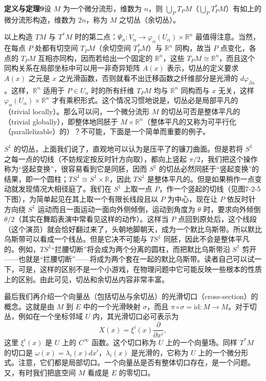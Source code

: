 \noindent\textbf{定义与定理9}\quad 设 $M$ 为一个微分流形，维数为 $n$，则 $\bigcup_PT_PM$（$\bigcup_PT_P^*M$）有如上的微分流形构造，维数为 $2n$，称为 $M$ 之切丛（余切丛）。

以上构造 $TM$ 与 $T^*M$ 时的第二点：$\Psi_\alpha:V_\alpha\to\varphi_\alpha(U_\alpha)\times\mathbb R^n$ 最值得注意。当然，在每点 $P$ 处都有切空间 $T_PM$（余切空间 $T_P^*M$）与 $\mathbb R^n$ 同构，故当 $P$ 点变化，各点的 $T_PM$ 互相亦同构，因而若给出一个固定的 $\mathbb R^n$，这些 $T_PM\cong\mathbb R^n$，而且这个同构关系在局部坐标中可以用一非奇异矩阵 $A(x)$ 表示，切丛的定义要求 $A(x)$ 之元是 $x$ 之光滑函数，否则就看不出迁移函数之纤维部分是光滑的 $d\varphi_{\beta\alpha}$。这样，$\mathbb R^n$ 适用于 $P\in U_\alpha$ 时的所有纤维 $T_PM$ 均与 $\mathbb R^n$ 同构而与 $x$ 无关，这样 $\varphi_\alpha(U_\alpha)\times\mathbb R^n$ 才有乘积形式。这个情况习惯地说是，切丛必是局部平凡的（trivial locally）。那么可以问，一个微分流形 $M$ 的切丛可否是整体平凡的（trivial globally），即整体地同胚于 $M\times\mathbb R^n$（整体平凡的又称为可平行化（parallelizable）的）？不可能，下面是一个简单而重要的例子。

$S^1$ 的切丛，上面我们说了，直观地可以认为是压平了的镰刀曲面。但是若将 $S^1$ 之每一点的切线（不妨规定按反时针方向取），都向上竖起 $\pi/2$，我们把这个操作称为“竖起变换”，很容易看到它是同胚，因而 $S^1$ 的切丛必然同胚于“竖起变换”的结果，即一个圆柱；$TS^1\cong S^1\times\mathbb R$，因此 $TS^1$ 是整体平凡的。但是如果稍作一点变动就发现情况大相径庭了。我们在 $S^1$ 上取一点 $P$，作一个竖起的切线（见图7-2-5下图），为简单起见在其上取一个有限长线段且以 $P$ 为中心，现在让 $P$ 依反时针方向绕 $S^1$ 运动而且一面运动一面向外侧倾倒，运动到角度为 $\theta$ 时，要求向外倾倒 $\theta/2$（其实在舞蹈表演中常看见这样的动作）。这样当 $P$ 点回到原处后，这个线段（这个演员）就会恰好翻过来了，头朝地脚朝天，成为一个默比乌斯带。所以默比乌斯带可以看成一个线丛。但是它决不可能与 $TS^1$ 同胚，因此不会是整体平凡的。例如，$TS^1$“拦腰切断”将会成为两个分离的圆柱，而把默比乌斯带沿 $S^1$ 剪开——也就是“拦腰切断”——将成为两个套在一起的默比乌斯带。读者自己可以试一下，可是，这样的区别不是一个小游戏，在物理问题中它可能反映一些根本的性质上的区别。由此可见，切丛和余切丛内容非常丰富。

最后我们再介绍一个向量丛（包括切丛与余切丛）的光滑切口（cross-section）的概念。这就是由 $M$ 到 $E$ 中的一个光滑映射 $\sigma$，而且 $\pi\circ\sigma=\mathrm{id}:M\to M$。对于切丛，例如在一个坐标邻域 $U$ 内，其光滑切口必可表示为
\[
 X(x)=\xi^i(x)\frac{\partial}{\partial x^i},
\]
这里 $\xi^i(x)$ 是 $U$ 上的 $C^\infty$ 函数。这个切口称为 $U$ 上的一个向量场。同样 $T^*M$ 的切口是 $\omega(x)=\lambda_i(x)dx^i$，$\lambda_i(x)$ 是光滑的，它称为 $U$ 上的一个微分形式。注意，它们都是局部切口。一个向量丛是否有整体切口存在，是一个问题。又，有时我们把底空间 $M$ 看成是 $E$ 的零切口。

